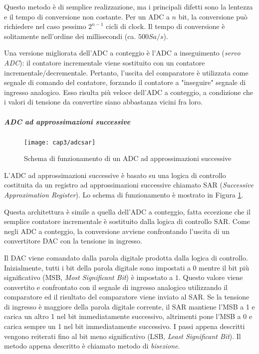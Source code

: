 Questo metodo è di semplice realizzazione, ma i principali difetti sono la lentezza e il tempo di conversione non costante. Per un ADC a $n$ bit, la conversione può richiedere nel caso pessimo $2^{n-1}$ cicli di clock. Il tempo di conversione è solitamente nell'ordine dei millisecondi (ca. $500 Sa/s$).

Una versione migliorata dell'ADC a conteggio è l'ADC a inseguimento (\textit{servo ADC}): il contatore incrementale viene sostituito con un contatore incrementale/decrementale. Pertanto, l'uscita del comparatore è utilizzata come segnale di comando del contatore, forzando il contatore a "inseguire" segnale di ingresso analogico. Esso risulta più veloce dell'ADC a conteggio, a condizione che i valori di tensione da convertire siano abbastanza vicini fra loro.

\subparagraph{\textbf{ADC ad approssimazioni successive}}
\begin{figure}  
  \begin{center}
    \texttt{[image: cap3/adcsar]}
    \caption{Schema di funzionamento di un ADC ad approssimazioni successive}
    \label{adcsar}
  \end{center}
\end{figure}
L'ADC ad approssimazioni successive è basato su una logica di controllo costituita da un registro ad approssimazioni successive chiamato SAR (\textit{Successive Approximation Register}). Lo schema di funzionamento è mostrato in Figura \ref{adcsar}.

Questa architettura è simile a quella dell'ADC a conteggio, fatta eccezione che il semplice contatore incrementale è sostituito dalla logica di controllo SAR. Come negli ADC a conteggio, la conversione avviene confrontando l'uscita di un convertitore DAC con la tensione in ingresso.

Il DAC viene comandato dalla parola digitale prodotta dalla logica di controllo. Inizialmente, tutti i bit della parola digitale sono impostati a 0 mentre il bit più significativo (MSB, \textit{Most Significant Bit}) è impostato a $1$. Questo valore viene convertito e confrontato con il segnale di ingresso analogico utilizzando il comparatore ed il risultato del comparatore viene inviato al SAR. Se la tensione di ingresso è maggiore della parola digitale corrente, il SAR mantiene l'MSB a 1 e carica un altro 1 nel bit immediatamente successivo, altrimenti pone l'MSB a 0 e carica sempre un 1 nel bit immediatamente successivo. I passi appena descritti vengono reiterati fino al bit meno significativo (LSB, \textit{Least Significant Bit}). Il metodo appena descritto è chiamato metodo di \textit{bisezione}.

